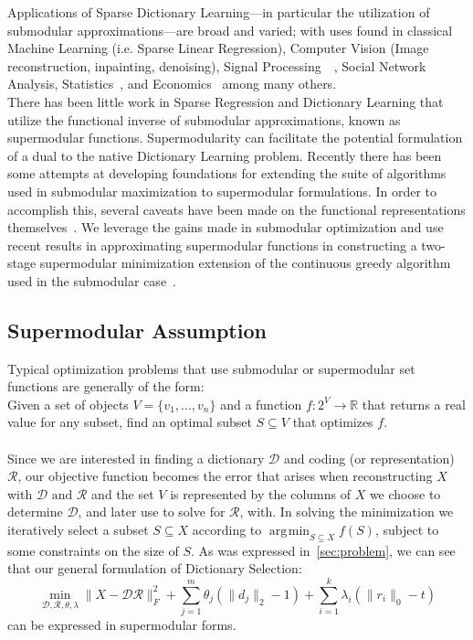 \documentclass{article}
\newcommand{\R}{\mathbb{R}}
\newcommand{\Rr}{\mathcal{R}}
\newcommand{\D}{\mathcal{D}}
\DeclareMathOperator*{\argmin}{\arg\!\min}
\begin{document}
\noindent Applications of Sparse Dictionary Learning---in particular the utilization of submodular approximations---are broad and varied; with uses found in classical Machine Learning (i.e. Sparse Linear Regression), Computer Vision (Image reconstruction, inpainting, denoising), Signal Processing~\cite{submod_sparsecoding}~\cite{nonconvexrelax}, Social Network Analysis, Statistics~\cite{rIBP}, and Economics~\cite{utilityWelfare} among many others. 
\\

\noindent There has been little work in Sparse Regression and Dictionary Learning that utilize the functional inverse of submodular approximations, known as supermodular functions. Supermodularity can facilitate the potential formulation of a dual to the native Dictionary Learning problem. Recently there has been some attempts at developing foundations for extending the suite of algorithms used in submodular maximization to supermodular formulations. In order to accomplish this, several caveats have been made on the functional representations themselves~\cite{weaklyalpha}. We leverage the gains made in submodular optimization and use recent results in approximating supermodular functions in constructing a two-stage supermodular minimization extension of the continuous greedy algorithm used in the submodular case~\cite{Singer16TwoStage}.

\subsection{Supermodular Assumption}\label{sec:supermod}

\noindent Typical optimization problems that use submodular or supermodular set functions are generally of the form:\\
\noindent Given a set of objects $V=\{v_1,\ldots,v_n\}$ and a function $f:2^V\to \R$ that returns a real value for any subset, find an optimal subset $S \subseteq V$ that optimizes $f$.
\\
\\
Since we are interested in finding a dictionary $\D$ and coding (or representation) $\Rr$, our objective function becomes the error that arises when reconstructing $X$ with $\D \text{ and } \Rr$ and the set $V$ is represented by the columns of $X$ we choose to determine $\D$, and later use to solve for $\Rr$, with. In solving the minimization we iteratively select a subset $S\subseteq X$ according to ${\argmin}_{S\subseteq X} f(S)$,  subject to some constraints on the size of $S$. As was expressed in~\ref{sec:problem}, we can see that our general formulation of Dictionary Selection:  
$$\min_{\D, \Rr, \theta, \lambda} \|X  -\D\Rr\|_F^2 + \sum_{j=1}^m \theta_j (\| d_j\|_2 - 1)+ \sum_{i=1}^k \lambda_i (\| r_i \|_0 - t)$$
can be expressed in supermodular forms.\\
\end{document}
